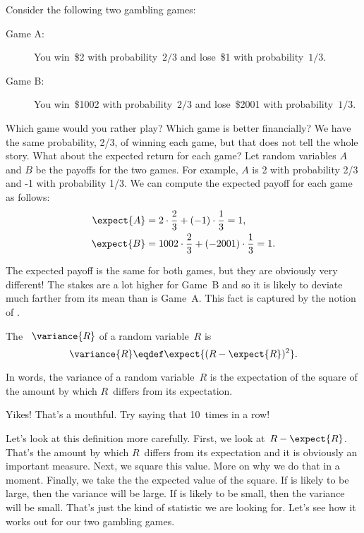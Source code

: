 Consider the following two gambling games:
\begin{description}

\item[Game A:]

You win~\$2 with probability~$2/3$ and lose~\$1 with
probability~$1/3$.

\item[Game B:]

You win~\$1002 with probability~$2/3$ and lose~\$2001 with
probability~$1/3$.

\end{description}
Which game would you rather play?  Which game is better financially?
We have the same probability, 2/3, of winning each game, but that does
not tell the whole story.  What about the expected return for each
game?  Let random variables $A$ and $B$ be the payoffs for the two
games.  For example, $A$ is 2 with probability 2/3 and -1 with
probability 1/3.  We can compute the expected payoff for each game as
follows:
\begin{align*}
    \expect{A} &= 2 \cdot \frac{2}{3} + (-1) \cdot \frac{1}{3} = 1, \\
    \expect{B} &= 1002 \cdot \frac{2}{3} + (-2001) \cdot \frac{1}{3} = 1.
\end{align*}

The expected payoff is the same for both games, but they are obviously
very different! The stakes are a lot higher for Game~B and so it is
likely to deviate much farther from its mean than is Game~A\@.  This
fact is captured by the notion of .

\begin{definition}\label{defvar}
The ~$\variance{R}$ of a random variable~$R$ is
\[
    \variance{R} \eqdef \expect{(R - \expect{R})^2}.
\]
\end{definition}

In words, the variance of a random variable~$R$ is the expectation of
the square of the amount by which $R$~differs from its expectation.

Yikes!  That's a mouthful.  Try saying that 10~times in a row!

Let's look at this definition more carefully.  First, we look at~$R -
\expect{R}$.  That's the amount by which $R$~differs from its
expectation and it is obviously an important measure.  Next, we square
this value.  More on why we do that in a moment.  Finally, we take the
the expected value of the square.  If  is likely to be large, then the
variance will be large.  If  is likely to be small, then
the variance will be small.  That's just the kind of statistic we are
looking for.  Let's see how it works out for our two gambling games.


